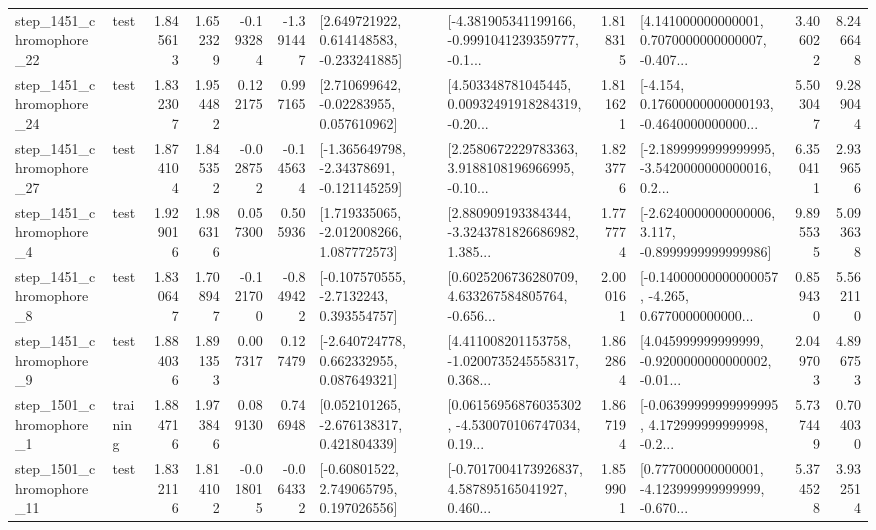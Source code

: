 \begin{tabular}{llrrrrllrlrr}
 step\_1451\_chromophore\_22 &      test &      1.845613 &    1.652329 &     -0.193284 & -1.391447 &    [2.649721922, 0.614148583, -0.233241885] &  [-4.381905341199166, -0.9991041239359777, -0.1... &       1.818315 &  [4.141000000000001, 0.7070000000000007, -0.407... &            3.406022 &          8.246648 \\
 step\_1451\_chromophore\_24 &      test &      1.832307 &    1.954482 &      0.122175 &  0.997165 &     [2.710699642, -0.02283955, 0.057610962] &  [4.503348781045445, 0.00932491918284319, -0.20... &       1.811621 &  [-4.154, 0.17600000000000193, -0.4640000000000... &            5.503047 &          9.289044 \\
 step\_1451\_chromophore\_27 &      test &      1.874104 &    1.845352 &     -0.028752 & -0.145634 &   [-1.365649798, -2.34378691, -0.121145259] &  [2.2580672229783363, 3.9188108196966995, -0.10... &       1.823776 &  [-2.1899999999999995, -3.5420000000000016, 0.2... &            6.350411 &          2.939656 \\
  step\_1451\_chromophore\_4 &      test &      1.929016 &    1.986316 &      0.057300 &  0.505936 &    [1.719335065, -2.012008266, 1.087772573] &  [2.880909193384344, -3.3243781826686982, 1.385... &       1.777774 &  [-2.6240000000000006, 3.117, -0.8999999999999986] &            9.895535 &          5.093638 \\
  step\_1451\_chromophore\_8 &      test &      1.830647 &    1.708947 &     -0.121700 & -0.849422 &     [-0.107570555, -2.7132243, 0.393554757] &  [0.6025206736280709, 4.633267584805764, -0.656... &       2.000161 &  [-0.14000000000000057, -4.265, 0.6770000000000... &            0.859430 &          5.562110 \\
  step\_1451\_chromophore\_9 &      test &      1.884036 &    1.891353 &      0.007317 &  0.127479 &    [-2.640724778, 0.662332955, 0.087649321] &  [4.411008201153758, -1.0200735245558317, 0.368... &       1.862864 &  [4.045999999999999, -0.9200000000000002, -0.01... &            2.049703 &          4.896753 \\
  step\_1501\_chromophore\_1 &  training &      1.884716 &    1.973846 &      0.089130 &  0.746948 &    [0.052101265, -2.676138317, 0.421804339] &  [0.06156956876035302, -4.530070106747034, 0.19... &       1.867194 &  [-0.06399999999999995, 4.172999999999998, -0.2... &            5.737449 &          0.704030 \\
 step\_1501\_chromophore\_11 &      test &      1.832116 &    1.814102 &     -0.018015 & -0.064332 &     [-0.60801522, 2.749065795, 0.197026556] &  [-0.7017004173926837, 4.587895165041927, 0.460... &       1.859901 &  [0.777000000000001, -4.123999999999999, -0.670... &            5.374528 &          3.932514 \\

\end{tabular}
